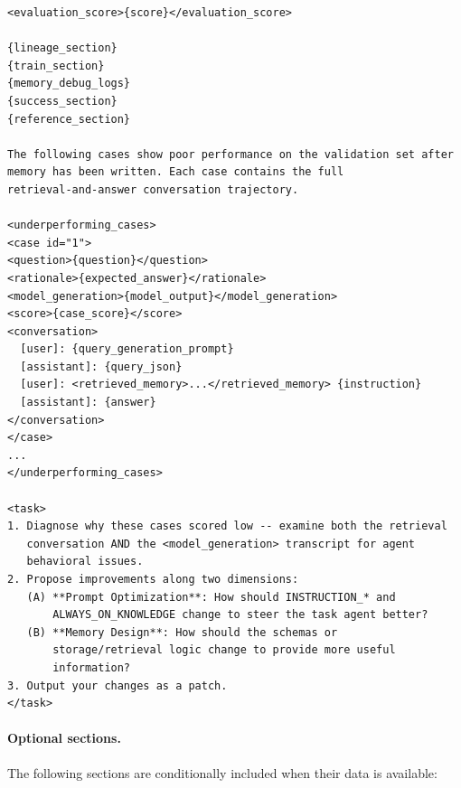 \begin{lstlisting}[style=evolvedcode, basicstyle=\ttfamily\scriptsize]
<evaluation_score>{score}</evaluation_score>

{lineage_section}
{train_section}
{memory_debug_logs}
{success_section}
{reference_section}

The following cases show poor performance on the validation set after
memory has been written. Each case contains the full
retrieval-and-answer conversation trajectory.

<underperforming_cases>
<case id="1">
<question>{question}</question>
<rationale>{expected_answer}</rationale>
<model_generation>{model_output}</model_generation>
<score>{case_score}</score>
<conversation>
  [user]: {query_generation_prompt}
  [assistant]: {query_json}
  [user]: <retrieved_memory>...</retrieved_memory> {instruction}
  [assistant]: {answer}
</conversation>
</case>
...
</underperforming_cases>

<task>
1. Diagnose why these cases scored low -- examine both the retrieval
   conversation AND the <model_generation> transcript for agent
   behavioral issues.
2. Propose improvements along two dimensions:
   (A) **Prompt Optimization**: How should INSTRUCTION_* and
       ALWAYS_ON_KNOWLEDGE change to steer the task agent better?
   (B) **Memory Design**: How should the schemas or
       storage/retrieval logic change to provide more useful
       information?
3. Output your changes as a patch.
</task>
\end{lstlisting}

\paragraph{Optional sections.}
The following sections are conditionally included when their data is available:

